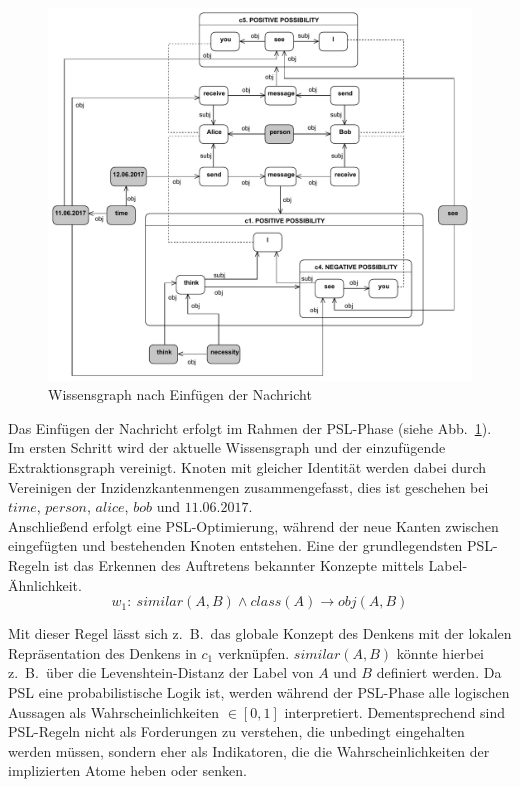 \documentclass[11pt, a4paper]{scrreprt}
\begin{document}
\begin{figure}[h]
	\centering
	\includegraphics[width=0.8\linewidth]{assets/exampleKnowledgeGraph}
	\caption{Wissensgraph nach Einfügen der Nachricht}\label{fig:exampleKnowledgeGraph}
\end{figure}

Das Einfügen der Nachricht erfolgt im Rahmen der PSL-Phase (siehe Abb.~\ref{fig:exampleKnowledgeGraph}).
Im ersten Schritt wird der aktuelle Wissensgraph und der einzufügende Extraktionsgraph vereinigt.
Knoten mit gleicher Identität werden dabei durch Vereinigen der Inzidenzkantenmengen zusammengefasst, dies ist geschehen bei \(time\), \(person\), \(alice\), \(bob\) und \(11.06.2017\).\\

Anschließend erfolgt eine PSL-Optimierung, während der neue Kanten zwischen eingefügten und bestehenden Knoten entstehen.
Eine der grundlegendsten PSL-Regeln ist das Erkennen des Auftretens bekannter Konzepte mittels Label-Ähnlichkeit.
\[w_1:\ similar(A, B) \land class(A) \rightarrow obj(A, B)\]

Mit dieser Regel lässt sich z.~B.\ das globale Konzept des Denkens mit der lokalen Repräsentation des Denkens in \(c_1\) verknüpfen.
\(similar(A, B)\) könnte hierbei z.~B.\ über die Levenshtein-Distanz der Label von \(A\) und \(B\) definiert werden.
Da PSL eine probabilistische Logik ist, werden während der PSL-Phase alle logischen Aussagen als Wahrscheinlichkeiten \(\in [0, 1]\) interpretiert.
Dementsprechend sind PSL-Regeln nicht als Forderungen zu verstehen, die unbedingt eingehalten werden müssen, sondern eher als Indikatoren, die die Wahrscheinlichkeiten der implizierten Atome heben oder senken.\\
\end{document}
